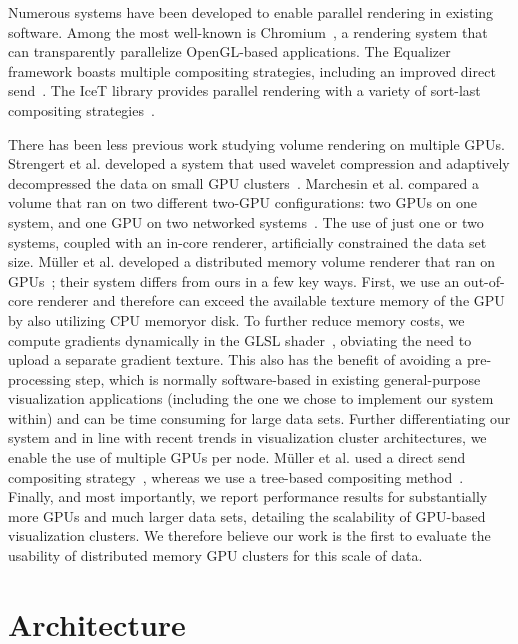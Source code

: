 Numerous systems have been developed to enable parallel rendering in
existing software.  Among the most well-known is
Chromium~\cite{HHN:2002:???}, a rendering system that can transparently
parallelize OpenGL-based applications.  The Equalizer framework boasts
multiple compositing strategies, including an improved direct
send~\cite{EP:2007:???}.  The IceT library provides parallel rendering
with a variety of sort-last compositing strategies~\cite{MWP:2001:???}.

There has been less previous work studying volume rendering on
multiple GPUs.  Strengert et al. developed a system that used wavelet
compression and adaptively decompressed the data on small GPU
clusters~\cite{SMW:2004:???}.  Marchesin et al. compared a volume that
ran on two different two-GPU configurations: two GPUs on one system,
and one GPU on two networked systems~\cite{Marchesin:2008:MultiGPU}. The
use of just one or two systems, coupled with an in-core renderer,
artificially constrained the data set size.  M\"uller et al. developed
a distributed memory volume renderer that ran on
GPUs~\cite{Mueller:2006:???}; their system differs from ours in a few
key ways.  First, we use an out-of-core renderer and therefore can
exceed the available texture memory of the GPU by also utilizing CPU
memoryor disk.  To further reduce memory costs, we compute gradients
dynamically in the GLSL shader~\cite{KW:2003:???}, obviating the need
to upload a separate gradient texture.  This also has the benefit of
avoiding a pre-processing step, which is normally software-based in
existing general-purpose visualization applications (including the one
we chose to implement our system within) and can be time consuming for
large data sets.  Further differentiating our system and in line with
recent trends in visualization cluster architectures, we enable the use
of multiple GPUs per node.  M\"uller et al. used a direct send
compositing strategy~\cite{Hsu:1993:???, MPHK:1993:???}, whereas we use
a tree-based compositing method~\cite{MWP:2001:???}.  Finally, and
most importantly, we report performance results for substantially more
GPUs and much larger data sets, detailing the scalability of GPU-based
visualization clusters.  We therefore believe our work is the first
to evaluate the usability of distributed memory GPU clusters for this
scale of data.

\section{Architecture}
\label{sec:arch}

